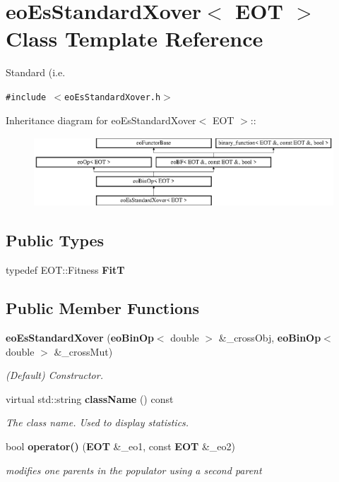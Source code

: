 \section{eo\-Es\-Standard\-Xover$<$ EOT $>$ Class Template Reference}
\label{classeo_es_standard_xover}
Standard (i.e.  


{\tt \#include $<$eo\-Es\-Standard\-Xover.h$>$}

Inheritance diagram for eo\-Es\-Standard\-Xover$<$ EOT $>$::\begin{figure}[H]
\begin{center}
\leavevmode
\includegraphics[height=2.60163cm]{classeo_es_standard_xover}
\end{center}
\end{figure}
\subsection*{Public Types}
\begin{CompactItemize}
\item 
typedef EOT::Fitness {\bf Fit\-T}\label{classeo_es_standard_xover_w0}

\end{CompactItemize}
\subsection*{Public Member Functions}
\begin{CompactItemize}
\item 
{\bf eo\-Es\-Standard\-Xover} ({\bf eo\-Bin\-Op}$<$ double $>$ \&\_\-cross\-Obj, {\bf eo\-Bin\-Op}$<$ double $>$ \&\_\-cross\-Mut)\label{classeo_es_standard_xover_a0}

\begin{CompactList}\small\item\em (Default) Constructor. \item\end{CompactList}\item 
virtual std::string {\bf class\-Name} () const \label{classeo_es_standard_xover_a1}

\begin{CompactList}\small\item\em The class name. Used to display statistics. \item\end{CompactList}\item 
bool {\bf operator()} ({\bf EOT} \&\_\-eo1, const {\bf EOT} \&\_\-eo2)\label{classeo_es_standard_xover_a2}

\begin{CompactList}\small\item\em modifies one parents in the populator using a second parent \item\end{CompactList}\end{CompactItemize}
